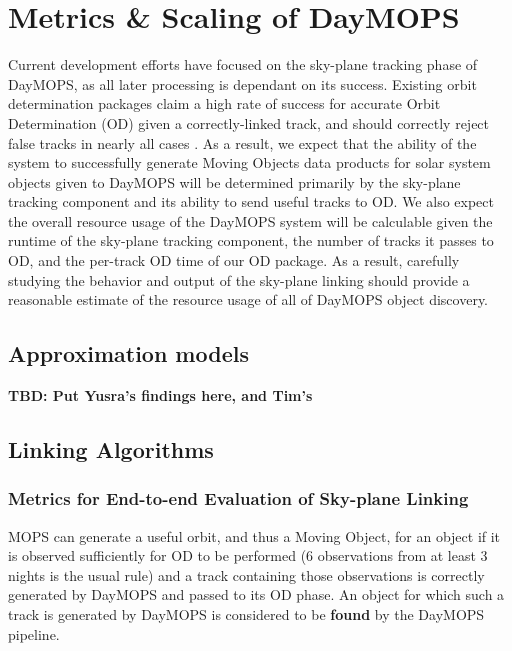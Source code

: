 \section{Metrics \& Scaling of DayMOPS}

Current development efforts have focused on the sky-plane tracking
phase of DayMOPS, as all later processing is dependant on its
success. Existing orbit determination packages claim a high rate of
success for accurate Orbit Determination (OD) given a correctly-linked
track, and should correctly reject false tracks in nearly all cases
\citep{Milani2006}. As a result, we expect that the ability of the
system to successfully generate Moving Objects data products for solar
system objects given to DayMOPS will be determined primarily by the
sky-plane tracking component and its ability to send useful tracks to
OD.  We also expect the overall resource usage of the DayMOPS system
will be calculable given the runtime of the sky-plane tracking
component, the number of tracks it passes to OD, and the per-track OD
time of our OD package.  As a result, carefully studying the behavior
and output of the sky-plane linking should provide a reasonable
estimate of the resource usage of all of DayMOPS object discovery.



\subsection{Approximation models}

\textbf{TBD: Put Yusra's findings here, and Tim's}



\subsection{Linking Algorithms}



\subsubsection{Metrics for End-to-end Evaluation of Sky-plane Linking}
MOPS can generate a useful orbit, and thus a Moving Object, for an
object if it is observed sufficiently for OD to be performed (6
observations from at least 3 nights is the usual rule) and a track
containing those observations is correctly generated by DayMOPS and
passed to its OD phase.  An object for which such a track is generated
by DayMOPS is considered to be \textbf{found} by the DayMOPS pipeline.

